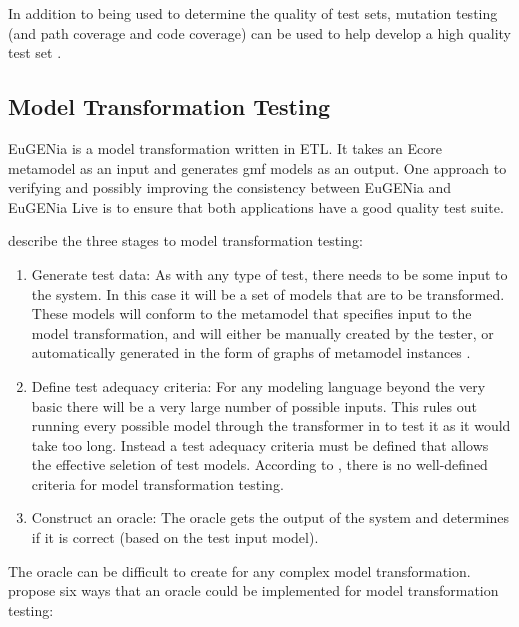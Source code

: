 In addition to being used to determine the quality of test sets, mutation testing (and path coverage and code coverage) can be used to help develop a high quality test set \citep{softwareTestingIntro}.

\subsection{Model Transformation Testing}

EuGENia is a model transformation written in ETL. It takes an Ecore metamodel as an input and generates gmf models as an output\citep{eugeniaSite}. One approach to verifying and possibly improving the consistency between EuGENia and EuGENia Live is to ensure that both applications have a good quality test suite.

\citet{mttBarriers} describe the three stages to model transformation testing:

\begin{enumerate}
	\item Generate test data: As with any type of test, there needs to be some input to the system. In this case it will be a set of models that are to be transformed. These models will conform to the metamodel that specifies input to the model transformation, and will either be manually created by the tester, or automatically generated in the form of graphs of metamodel instances \citep{mttBarriers}.
	\item Define test adequacy criteria: For any modeling language beyond the very basic there will be a very large number of possible inputs. This rules out running every possible model through the transformer in to test it as it would take too long. Instead a test adequacy criteria must be defined that allows the effective seletion of test models. According to \citet{mttBarriers}, there is no well-defined criteria for model transformation testing.
	\item Construct an oracle: The oracle gets the output of the system and determines if it is correct (based on the test input model).
\end{enumerate}


The oracle can be difficult to create for any complex model transformation. \citet{mttOracleIssue} propose six ways that an oracle could be implemented for model transformation testing:

